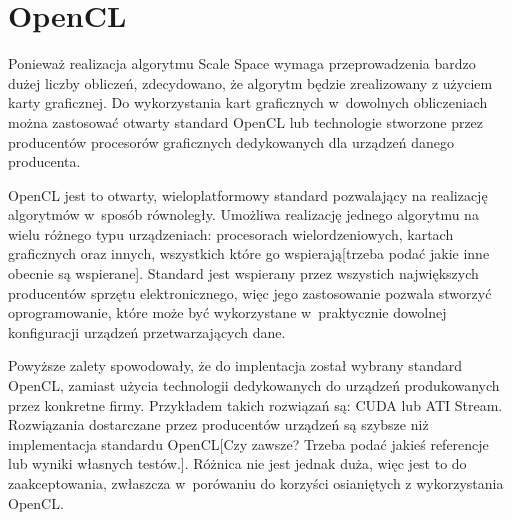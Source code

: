 \section{OpenCL}
\label{sec:OpenCL}

Ponieważ realizacja algorytmu Scale Space wymaga przeprowadzenia bardzo dużej liczby obliczeń, zdecydowano, że algorytm będzie zrealizowany z użyciem karty graficznej. Do wykorzystania kart graficznych w~dowolnych obliczeniach można zastosować otwarty standard OpenCL lub technologie stworzone przez producentów procesorów graficznych dedykowanych dla urządzeń danego producenta.

OpenCL jest to otwarty, wieloplatformowy standard pozwalający na realizację algorytmów w~sposób równoległy. Umożliwa realizację jednego algorytmu na wielu różnego typu urządzeniach: procesorach wielordzeniowych, kartach graficznych oraz innych, wszystkich które go wspierają[trzeba podać jakie inne obecnie są wspierane]. Standard jest wspierany przez wszystich największych producentów sprzętu elektronicznego, więc jego zastosowanie pozwala stworzyć oprogramowanie, które może być wykorzystane w~praktycznie dowolnej konfiguracji urządzeń przetwarzających dane.

Powyższe zalety spowodowały, że do implentacja został wybrany standard OpenCL, zamiast użycia technologii dedykowanych do urządzeń produkowanych przez konkretne firmy. Przykładem takich rozwiązań są: CUDA lub ATI Stream. Rozwiązania dostarczane przez producentów urządzeń są szybsze niż implementacja standardu OpenCL[Czy zawsze? Trzeba podać jakieś referencje lub wyniki własnych testów.]. Różnica nie jest jednak duża, więc jest to do zaakceptowania, zwłaszcza w~porówaniu do korzyści osianiętych z wykorzystania OpenCL.


